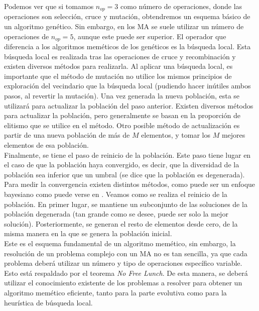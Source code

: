 Podemos ver que si tomamos $n_{op}=3$ como número de operaciones, donde las operaciones son selección, cruce y mutación, obtendremos un esquema básico de un algoritmo genético. Sin embargo, en los MA se suele utilizar un número de operaciones de $n_{op}=5$, aunque este puede ser superior. El operador que diferencia a los algoritmos meméticos de los genéticos es la búsqueda local. Esta búsqueda local es realizada tras las operaciones de cruce y recombinación y existen diversos métodos para realizarla. Al aplicar una búsqueda local, es importante que el método de mutación no utilice los mismos principios de exploración del vecindario que la búsqueda local (pudiendo hacer inútiles ambos pasos, al revertir la mutación). Una vez generada la nueva población, esta se utilizará para actualizar la población del paso anterior. Existen diversos métodos para actualizar la población, pero generalmente se basan en la proporción de elitismo que se utilice en el método. Otro posible método de actualización es partir de una nueva población de más de $M$ elementos, y tomar los $M$ mejores elementos de esa población.\\

Finalmente, se tiene el paso de reinicio de la población. Este paso tiene lugar en el caso de que la población haya convergido, es decir, que la diversidad de la población sea inferior que un umbral (se dice que la población es degenerada). Para medir la convergencia existen distintos métodos, como puede ser un enfoque bayesiano como puede verse en \cite{Hulin1997AnOS}. Veamos como se realiza el reinicio de la población. En primer lugar, se mantiene un subconjunto de las soluciones de la población degenerada (tan grande como se desee, puede ser solo la mejor solución). Posteriormente, se generan el resto de elementos desde cero, de la misma manera en la que se genera la población inicial.\\

Este es el esquema fundamental de un algoritmo memético, sin embargo, la resolución de un problema complejo con un MA no es tan sencilla, ya que cada problema deberá utilizar un número y tipo de operaciones específico variable. Esto está respaldado por el teorema \textit{No Free Lunch}. De esta manera, se deberá utilizar el conocimiento existente de los problemas a resolver para obtener un algoritmo memético eficiente, tanto para la parte evolutiva como para la heurística de búsqueda local. 

